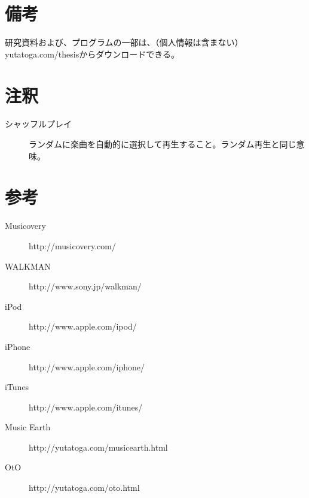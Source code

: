 \documentclass[11pt, twocolumn]{jsarticle}
\begin{document}
\section{備考}
研究資料および、プログラムの一部は、（個人情報は含まない）
yutatoga.com/thesisからダウンロードできる。

\section{注釈}
\begin{description}
\item[シャッフルプレイ]
ランダムに楽曲を自動的に選択して再生すること。ランダム再生と同じ意味。

\end{description}

\section{参考}
\begin{description}
\item[Musicovery]
http://musicovery.com/
\item[WALKMAN]
http://www.sony.jp/walkman/
\item[iPod]
http://www.apple.com/ipod/
\item[iPhone]
http://www.apple.com/iphone/
\item[iTunes]
http://www.apple.com/itunes/
\item[Music Earth]
http://yutatoga.com/musicearth.html
\item[OtO]
http://yutatoga.com/oto.html

\end{description}
\end{document}

